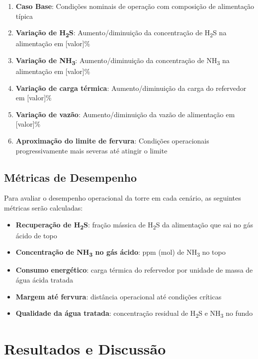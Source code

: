\begin{enumerate}
  \item \textbf{Caso Base}: Condições nominais de operação com composição de alimentação típica
  \item \textbf{Variação de H\textsubscript{2}S}: Aumento/diminuição da concentração de H\textsubscript{2}S na alimentação em [valor]\%
  \item \textbf{Variação de NH\textsubscript{3}}: Aumento/diminuição da concentração de NH\textsubscript{3} na alimentação em [valor]\%
  \item \textbf{Variação de carga térmica}: Aumento/diminuição da carga do refervedor em [valor]\%
  \item \textbf{Variação de vazão}: Aumento/diminuição da vazão de alimentação em [valor]\%
  \item \textbf{Aproximação do limite de fervura}: Condições operacionais progressivamente mais severas até atingir o limite
\end{enumerate}

\subsection{Métricas de Desempenho}

Para avaliar o desempenho operacional da torre em cada cenário, as seguintes métricas serão calculadas:

\begin{itemize}[leftmargin=*]
  \item \textbf{Recuperação de H\textsubscript{2}S}: fração mássica de H\textsubscript{2}S da alimentação que sai no gás ácido de topo
  \item \textbf{Concentração de NH\textsubscript{3} no gás ácido}: ppm (mol) de NH\textsubscript{3} no topo
  \item \textbf{Consumo energético}: carga térmica do refervedor por unidade de massa de água ácida tratada
  \item \textbf{Margem até fervura}: distância operacional até condições críticas
  \item \textbf{Qualidade da água tratada}: concentração residual de H\textsubscript{2}S e NH\textsubscript{3} no fundo
\end{itemize}

\section{Resultados e Discussão}\label{sec:resultados}

